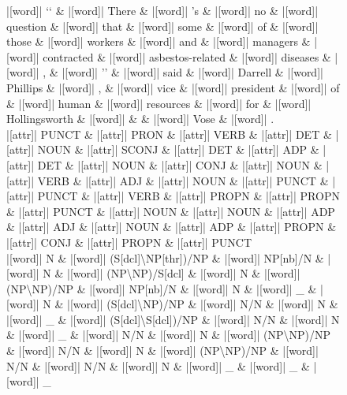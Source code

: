 \documentclass[10pt,a4paper]{article}
\begin{document}
\begin{figure}[h]
{\begin{dependency}[theme = simple]
\begin{deptext}[column sep=1em, row sep=0.1em]
|[word]| {}`{}` \& |[word]| There \& |[word]| 's \& |[word]| no \& |[word]| question \& |[word]| that \& |[word]| some \& |[word]| of \& |[word]| those \& |[word]| workers \& |[word]| and \& |[word]| managers \& |[word]| contracted \& |[word]| asbestos-related \& |[word]| diseases \& |[word]| , \& |[word]| '' \& |[word]| said \& |[word]| Darrell \& |[word]| Phillips \& |[word]| , \& |[word]| vice \& |[word]| president \& |[word]| of \& |[word]| human \& |[word]| resources \& |[word]| for \& |[word]| Hollingsworth \& |[word]| \& \& |[word]| Vose \& |[word]| . \\
|[attr]| PUNCT \& |[attr]| PRON \& |[attr]| VERB \& |[attr]| DET \& |[attr]| NOUN \& |[attr]| SCONJ \& |[attr]| DET \& |[attr]| ADP \& |[attr]| DET \& |[attr]| NOUN \& |[attr]| CONJ \& |[attr]| NOUN \& |[attr]| VERB \& |[attr]| ADJ \& |[attr]| NOUN \& |[attr]| PUNCT \& |[attr]| PUNCT \& |[attr]| VERB \& |[attr]| PROPN \& |[attr]| PROPN \& |[attr]| PUNCT \& |[attr]| NOUN \& |[attr]| NOUN \& |[attr]| ADP \& |[attr]| ADJ \& |[attr]| NOUN \& |[attr]| ADP \& |[attr]| PROPN \& |[attr]| CONJ \& |[attr]| PROPN \& |[attr]| PUNCT \\
|[word]| N \& |[word]| (S{[}dcl{]}\textbackslash{}NP{[}thr{]})/NP \& |[word]| NP{[}nb{]}/N \& |[word]| N \& |[word]| (NP\textbackslash{}NP)/S{[}dcl{]} \& |[word]| N \& |[word]| (NP\textbackslash{}NP)/NP \& |[word]| NP{[}nb{]}/N \& |[word]| N \& |[word]| \_ \& |[word]| N \& |[word]| (S{[}dcl{]}\textbackslash{}NP)/NP \& |[word]| N/N \& |[word]| N \& |[word]| \_ \& |[word]| (S{[}dcl{]}\textbackslash{}S{[}dcl{]})/NP \& |[word]| N/N \& |[word]| N \& |[word]| \_ \& |[word]| N/N \& |[word]| N \& |[word]| (NP\textbackslash{}NP)/NP \& |[word]| N/N \& |[word]| N \& |[word]| (NP\textbackslash{}NP)/NP \& |[word]| N/N \& |[word]| N/N \& |[word]| N \& |[word]| \_ \& |[word]| \_ \& |[word]| \_ \\
\end{deptext}




\end{dependency}}
\end{figure}
\end{document}
